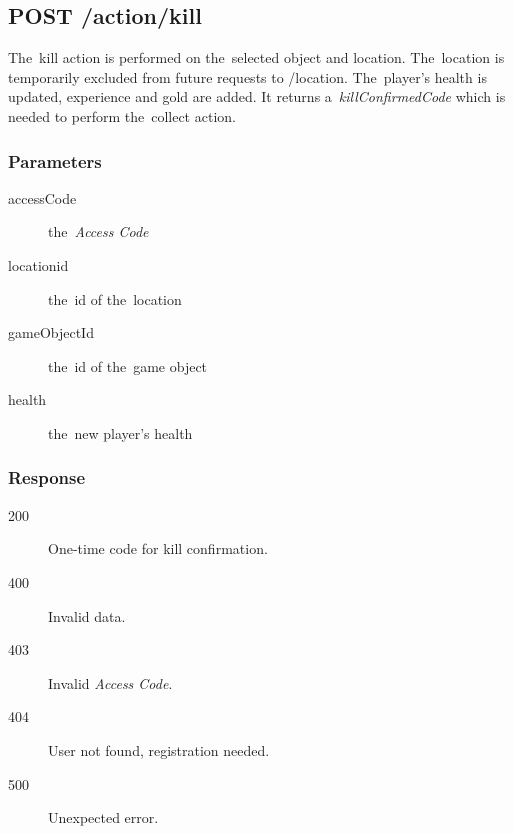\subsection{POST /action/kill}

The~kill action is performed on the~selected object and location. The~location is temporarily excluded from future requests to /location. The~player's health is updated, experience and gold are added. It returns a~\textit{killConfirmedCode} which is needed to perform the~collect action.

\subsubsection*{Parameters}

\begin{description}

	\item[accessCode] the~\textit{Access Code}

	\item[locationid] the~id of the~location

	\item[gameObjectId] the~id of the~game object

	\item[health] the~new player's health

\end{description}

\subsubsection*{Response}

\begin{description}

	\item[200] One-time code for kill confirmation.

	\item[400] Invalid data.

	\item[403] Invalid \textit{Access Code}.

	\item[404] User not found, registration needed.

	\item[500] Unexpected error.

\end{description}